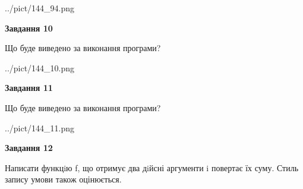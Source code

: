 \documentclass[12pt, ukrainian]{article}
\begin{document}
{\begin {large}
\begin{center}
	{../pict/144_94.png}
\end{center}
\newpage

{\begin {center}\textbf{Завдання 10}\end {center}}

Що буде виведено за виконання програми?\par
\begin{center}
	{../pict/144_10.png}
\end{center}
\newpage

{\begin {center}\textbf{Завдання 11}\end {center}}

Що буде виведено за виконання програми?\par
\begin{center}
	{../pict/144_11.png}
\end{center}
\newpage

{\begin {center}\textbf{Завдання 12}\end {center}}


Написати функцiю f, що отримує два дiйсні аргументи i повертає їх суму. Стиль запису умови також оцінюється.\par
\newpage

\end {large}}
\end{document}
